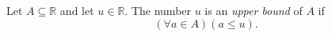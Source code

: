 \begin{definition}
\label{def:real-upper-bound}
Let $A\subseteq\mathbb{R}$ and let $u\in\mathbb{R}$. The number $u$ is an
\emph{upper bound} of $A$ if
\[
  (\forall a\in A)(a\leq u).
\]
\end{definition}